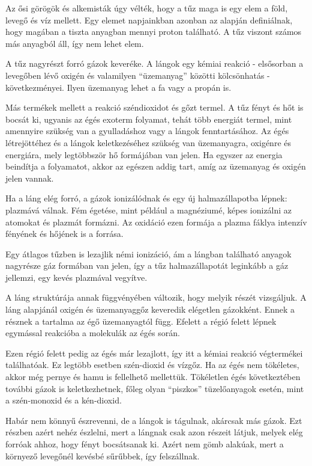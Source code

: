 
Az ősi görögök és alkemisták úgy vélték, hogy a tűz maga is egy elem a föld, levegő és víz mellett. Egy elemet napjainkban azonban az alapján definiálnak, hogy magában a tiszta anyagban mennyi proton található. A tűz viszont számos más anyagból áll, így nem lehet elem. 

A tűz nagyrészt forró gázok keveréke. A lángok egy kémiai reakció - elsősorban a levegőben lévő oxigén és valamilyen ``üzemanyag'' közötti kölcsönhatás - következményei. Ilyen üzemanyag lehet a fa vagy a propán is.

Más termékek mellett a reakció széndioxidot és gőzt termel. A tűz fényt és hőt is bocsát ki, ugyanis az égés exoterm folyamat, tehát több energiát termel, mint amennyire szükség van a gyulladáshoz vagy a lángok fenntartásához. Az égés létrejöttéhez és a lángok keletkezéséhez szükség van üzemanyagra, oxigénre és energiára, mely legtöbbször hő formájában van jelen. Ha egyszer az energia beindítja a folyamatot, akkor az egészen addig tart, amíg az üzemanyag és oxigén jelen vannak. \cite{firePhysics2}

Ha a láng elég forró, a gázok ionizálódnak és egy új halmazállapotba lépnek: plazmává válnak. Fém égetése, mint például a magnéziumé, képes ionizálni az atomokat és plazmát formázni. Az oxidáció ezen formája a plazma fáklya intenzív fényének és hőjének is a forrása.

Egy átlagos tűzben is lezajlik némi ionizáció, ám a lángban található anyagok nagyrésze gáz formában van jelen, így a tűz halmazállapotát leginkább a gáz jellemzi, egy kevés plazmával vegyítve.

A láng struktúrája annak függvényében változik, hogy melyik részét vizsgáljuk. A láng alapjánál oxigén és üzemanyaggőz keveredik elégetlen gázokként. Ennek a résznek a tartalma az égő üzemanyagtól függ. Efelett a régió felett lépnek egymással reakcióba a molekulák az égés során. 

Ezen régió felett pedig az égés már lezajlott, így itt a kémiai reakció végtermékei találhatóak. Ez legtöbb esetben szén-dioxid és vízgőz. Ha az égés nem tökéletes, akkor még pernye és hamu is fellelhető mellettük. Tökéletlen égés következtében további gázok is keletkezhetnek, főleg olyan ``piszkos'' tüzelőanyagok esetén, mint a szén-monoxid és a kén-dioxid.

Habár nem könnyű észrevenni, de a lángok is tágulnak, akárcsak más gázok. Ezt részben azért nehéz észlelni, mert a lángnak csak azon részeit látjuk, melyek elég forróak ahhoz, hogy fényt bocsátsanak ki. Azért nem gömb alakúak, mert a környező levegőnél kevésbé sűrűbbek, így felszállnak.

